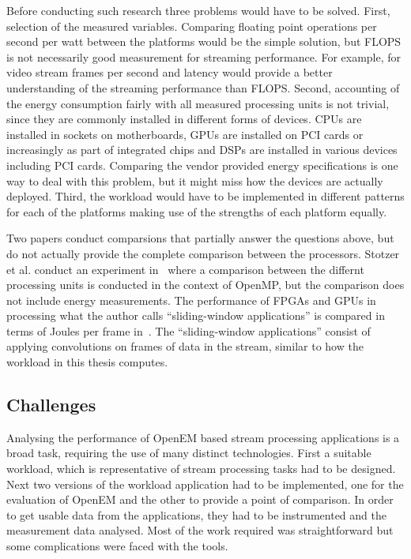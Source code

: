 Before conducting such research three problems would have to be solved. First, selection of the measured variables. Comparing floating point operations per second per watt between the platforms would be the simple solution, but FLOPS is not necessarily good measurement for streaming performance. For example, for video stream frames per second and latency would provide a better understanding of the streaming performance than FLOPS. Second, accounting of the energy consumption fairly with all measured processing units is not trivial, since they are commonly installed in different forms of devices. CPUs are installed in sockets on motherboards, GPUs are installed on PCI cards or increasingly as part of integrated chips and DSPs are installed in various devices including PCI cards. Comparing the vendor provided energy specifications is one way to deal with this problem, but it might miss how the devices are actually deployed. Third, the workload would have to be implemented in different patterns for each of the platforms making use of the strengths of each platform equally.

Two papers conduct comparsions that partially answer the questions above, but do not actually provide the complete comparison between the processors. Stotzer et al. conduct an experiment in~\cite{stotzer2013openmp} where a comparison between the differnt processing units is conducted in the context of OpenMP, but the comparison does not include energy measurements. The performance of FPGAs and GPUs in processing what the author calls ``sliding-window applications'' is compared in terms of Joules per frame in~\cite{fowers2012performance}. The ``sliding-window applications'' consist of applying convolutions on frames of data in the stream, similar to how the workload in this thesis computes.

\subsection{Challenges}
\label{subsec:challenges}
Analysing the performance of OpenEM based stream processing applications is a broad task, requiring the use of many distinct technologies. First a suitable workload, which is representative of stream processing tasks had to be designed. Next two versions of the workload application had to be implemented, one for the evaluation of OpenEM and the other to provide a point of comparison. In order to get usable data from the applications, they had to be instrumented and the measurement data analysed. Most of the work required was straightforward but some complications were faced with the tools.

